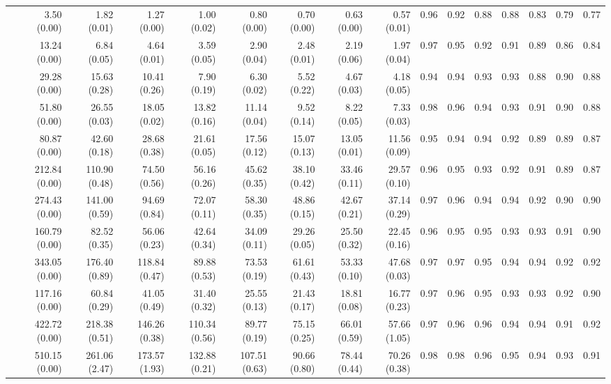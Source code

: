\documentclass[preprint]{tlp}
\begin{document}
\begin{landscape}
\begin{tabular}{@{\extracolsep{\fill}}|c|r|r|r|r|r|r|r|r||r|r|r|r|r|r|r|}
\cline{1-16}
&3.50 (0.00) &  1.82 (0.01) &  1.27 (0.00) &  1.00 (0.02) &  0.80 (0.00) &  0.70 (0.00) &  0.63 (0.00) &  0.57 (0.01) &  0.96 & 0.92 & 0.88 & 0.88 & 0.83 & 0.79 & 0.77 \\
&13.24 (0.00) &  6.84 (0.05) &  4.64 (0.01) &  3.59 (0.05) &  2.90 (0.04) &  2.48 (0.01) &  2.19 (0.06) &  1.97 (0.04) & 0.97 & 0.95 & 0.92 & 0.91 & 0.89 & 0.86 & 0.84 \\
&29.28 (0.00) &  15.63 (0.28) &  10.41 (0.26) &  7.90 (0.19) &  6.30 (0.02) &  5.52 (0.22) &  4.67 (0.03) &  4.18 (0.05) & 0.94 & 0.94 & 0.93 & 0.93 & 0.88 & 0.90 & 0.88 \\
&51.80 (0.00) &  26.55 (0.03) &  18.05 (0.02) &  13.82 (0.16) &  11.14 (0.04) &  9.52 (0.14) &  8.22 (0.05) &  7.33 (0.03) & 0.98 & 0.96 & 0.94 & 0.93 & 0.91 & 0.90 & 0.88 \\
&80.87 (0.00) &  42.60 (0.18) &  28.68 (0.38) &  21.61 (0.05) &  17.56 (0.12) &  15.07 (0.13) &  13.05 (0.01) &  11.56 (0.09) & 0.95 & 0.94 & 0.94 & 0.92 & 0.89 & 0.89 & 0.87 \\
&212.84 (0.00) &  110.90 (0.48) &  74.50 (0.56) &  56.16 (0.26) &  45.62 (0.35) &  38.10 (0.42) &  33.46 (0.11) &  29.57 (0.10) &0.96 & 0.95 & 0.93 & 0.92 & 0.91 & 0.89 & 0.87 \\
&274.43 (0.00) &  141.00 (0.59) &  94.69 (0.84) &  72.07 (0.11) &  58.30 (0.35) &  48.86 (0.15) &  42.67 (0.21) &  37.14 (0.29) & 0.97 & 0.96 & 0.94 & 0.94 & 0.92 & 0.90 & 0.90 \\
&160.79 (0.00) &  82.52 (0.35) &  56.06 (0.23) &  42.64 (0.34) &  34.09 (0.11) &  29.26 (0.05) &  25.50 (0.32) &  22.45 (0.16) & 0.96 & 0.95 & 0.95 & 0.93 & 0.93 & 0.91 & 0.90 \\
&343.05 (0.00) &  176.40 (0.89) &  118.84 (0.47) &  89.88 (0.53) &  73.53 (0.19) &  61.61 (0.43) &  53.33 (0.10) &  47.68 (0.03) & 0.97 & 0.97 & 0.95 & 0.94 & 0.94 & 0.92 & 0.92 \\
&117.16 (0.00) &  60.84 (0.29) &  41.05 (0.49) &  31.40 (0.32) &  25.55 (0.13) &  21.43 (0.17) &  18.81 (0.08) &  16.77 (0.23) & 0.97 & 0.96 & 0.95 & 0.93 & 0.93 & 0.92 & 0.90 \\
&422.72 (0.00) &  218.38 (0.51) &  146.26 (0.38) &  110.34 (0.56) &  89.77 (0.19) &  75.15 (0.25) &  66.01 (0.59) &  57.66 (1.05) & 0.97 & 0.96 & 0.96 & 0.94 & 0.94 & 0.91 & 0.92 \\
&510.15 (0.00) &  261.06 (2.47) &  173.57 (1.93) &  132.88 (0.21) &  107.51 (0.63) &  90.66 (0.80) &  78.44 (0.44) &  70.26 (0.38) & 0.98 & 0.98 & 0.96 & 0.95 & 0.94 & 0.93 & 0.91 \\
\cline{1-16}


\end{tabular}

  \label{tab_2}
\end{landscape}
\end{document}
